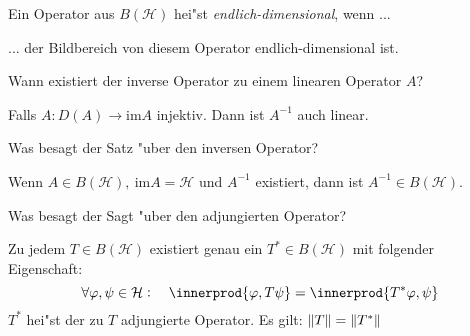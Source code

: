\documentclass[9pt]{article}
\DeclarePairedDelimiter{\innerprod}\langle\rangle
\newcommand{\Hi}{\mathcal{H}}
\newenvironment{field}{}{\newpage}
\newif\ifnote
\newenvironment{note}{\notetrue}{\notefalse}
\newcommand{\localtag}{}
\newcommand{\globaltag}{}
\newcommand{\uuid}{}
\newcommand{\tags}[1]{
    \ifnote 
        \renewcommand{\localtag}{#1}
    \else
        \renewcommand{\globaltag}{#1}
    \fi 
    }
\newcommand{\xplain}[1]{\renewcommand{\uuid}{#1}}
\begin{document}
	\begin{note}
		\xplain{UUID}
		\tags{6.1.8}
		
		\begin{field}  %
			Ein Operator aus $B(\Hi)$ hei"st \textit{endlich-dimensional}, wenn ...
		\end{field}
		
		\begin{field}  %
			... der Bildbereich von diesem Operator endlich-dimensional ist.
		\end{field}
	\end{note}
	\begin{note}
		\xplain{UUID}
		\tags{6.1.9,6.1.10, inverse}
		
		\begin{field}  %
			Wann existiert der inverse Operator zu einem linearen Operator $A$?  
		\end{field}
		
		\begin{field}  %
			Falls $A: D(A) \rightarrow \text{im}A$ injektiv. Dann ist $A^{-1}$ auch linear.
		\end{field}
			
		\begin{field}  %
			Was besagt der Satz "uber den inversen Operator?
		\end{field}
		
		\begin{field}  %
			Wenn $A\in B(\Hi), \ \text{im}A=\Hi$ und $A^{-1}$ existiert, dann ist $A^{-1} \in B(\Hi)$.
		\end{field}
	\end{note}
	\begin{note}
		\xplain{UUID}
		\tags{6.2.1, adjungierte-operator}
		
		\begin{field}  %
			Was besagt der Sagt "uber den adjungierten Operator?
		\end{field}
		
		\begin{field}  %
			Zu jedem $T \in B(\Hi)$ existiert genau ein $T^*\in B(\Hi)$ mit folgender Eigenschaft:
			\begin{equation*}
				\forall \varphi, \psi \in \Hi: \quad \innerprod{\varphi, T\psi} = \innerprod{T^*\varphi, \psi}
			\end{equation*}
			$T^*$ hei"st der zu $T$ adjungierte Operator. Es gilt: $\norm{T}= \norm{T^*}$
		\end{field}
	\end{note}
\end{document}
